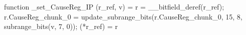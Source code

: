 function _set_CauseReg_IP (r_ref, v) = {
    r = __bitfield_deref(r_ref);
    r.CauseReg_chunk_0 = update_subrange_bits(r.CauseReg_chunk_0, 15, 8, subrange_bits(v, 7, 0));
    (*r_ref) = r
}
